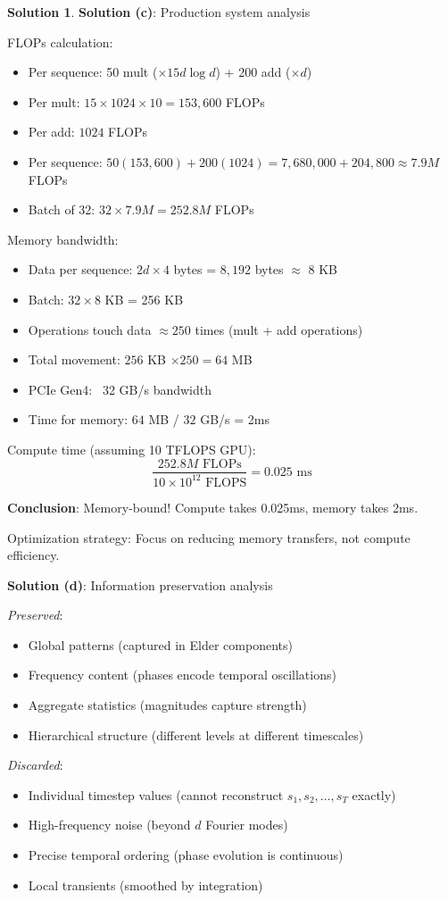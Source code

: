 \documentclass[12pt,a4paper]{article}
\theoremstyle{definition}
\newtheorem{solution}{Solution}[section]
\theoremstyle{remark}
\begin{document}
\begin{solution}
\textbf{Solution (c)}: Production system analysis

FLOPs calculation:
\begin{itemize}
\item Per sequence: 50 mult ($\times 15d\log d$) + 200 add ($\times d$)
\item Per mult: $15 \times 1024 \times 10 = 153,600$ FLOPs
\item Per add: $1024$ FLOPs
\item Per sequence: $50(153,600) + 200(1024) = 7,680,000 + 204,800 \approx 7.9M$ FLOPs
\item Batch of 32: $32 \times 7.9M = 252.8M$ FLOPs
\end{itemize}

Memory bandwidth:
\begin{itemize}
\item Data per sequence: $2d \times 4$ bytes = $8,192$ bytes $\approx$ 8 KB
\item Batch: $32 \times 8$ KB = 256 KB
\item Operations touch data $\approx 250$ times (mult + add operations)
\item Total movement: $256$ KB $ \times 250 = 64$ MB
\item PCIe Gen4: ~32 GB/s bandwidth
\item Time for memory: $64$ MB / $32$ GB/s = 2ms
\end{itemize}

Compute time (assuming 10 TFLOPS GPU):
$$\frac{252.8M \text{ FLOPs}}{10 \times 10^{12} \text{ FLOPS}} = 0.025 \text{ ms}$$

\textbf{Conclusion}: Memory-bound! Compute takes 0.025ms, memory takes 2ms.

Optimization strategy: Focus on reducing memory transfers, not compute efficiency.

\textbf{Solution (d)}: Information preservation analysis

\textit{Preserved}:
\begin{itemize}
\item Global patterns (captured in Elder components)
\item Frequency content (phases encode temporal oscillations)
\item Aggregate statistics (magnitudes capture strength)
\item Hierarchical structure (different levels at different timescales)
\end{itemize}

\textit{Discarded}:
\begin{itemize}
\item Individual timestep values (cannot reconstruct $s_1, s_2, \ldots, s_T$ exactly)
\item High-frequency noise (beyond $d$ Fourier modes)
\item Precise temporal ordering (phase evolution is continuous)
\item Local transients (smoothed by integration)
\end{itemize}


\end{solution}
\end{document}
